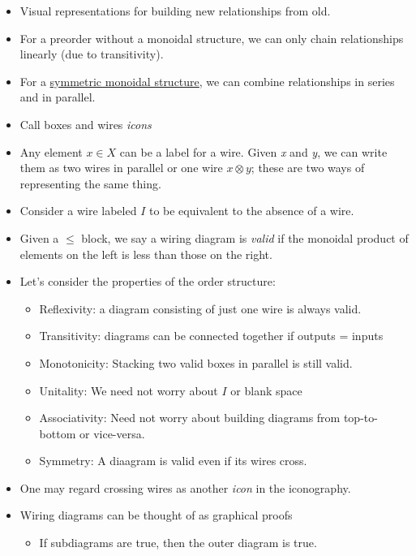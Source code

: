 \begin{itemize}
    \item Visual representations for building new relationships from old.
    \item For a preorder without a monoidal structure, we can only chain relationships linearly (due to transitivity).
    \item For a \hyperref[D2.2]{symmetric monoidal structure}, we can combine relationships in series and in parallel.
    \item Call boxes and wires \emph{icons}
    \item Any element $x \in X$ can be a label for a wire. Given \emph{x} and \emph{y}, we can write them as two wires in parallel or one wire $x \otimes y$; these are two ways of representing the same thing.
    \item Consider a wire labeled $I$ to be equivalent to the absence of a wire.
    \item Given a $\leq$ block, we say a wiring diagram is \emph{valid} if the monoidal product of elements on the left is less than those on the right.
    \item Let's consider the properties of the order structure:
          \begin{itemize}
            \item Reflexivity: a diagram consisting of just one wire is always valid.
            \item Transitivity: diagrams can be connected together if outputs = inputs
            \item Monotonicity: Stacking two valid boxes in parallel is still valid.
            \item Unitality: We need not worry about $I$ or blank space
            \item Associativity: Need not worry about building diagrams from top-to-bottom or vice-versa.
            \item Symmetry: A diaagram is valid even if its wires cross.
          \end{itemize}
    \item One may regard crossing wires as another \emph{icon} in the iconography.
    \item Wiring diagrams can be thought of as graphical proofs
          \begin{itemize}
            \item If subdiagrams are true, then the outer diagram is true.
          \end{itemize}
  \end{itemize}
